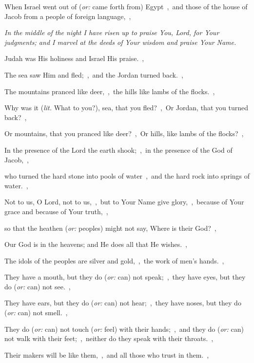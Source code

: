 \documentclass[12pt,twoside,a5paper]{article}
\newcommand{\qanona}[1]{{\liturgicalhint{Qanona.} \emph{#1}}}
\newcommand{\translationoption}[1]{\emph{or:} #1}
\newcommand{\translationliteral}[1]{\emph{lit.} #1}
\begin{document}
\begin{normalparskip}
  When Israel went out of (\translationoption{came forth from}) Egypt~\sep\ and those of the house of Jacob from a people of foreign language,~\sep

  \qanona{In the middle of the night I have risen up to praise You, Lord, for Your judgments; and I marvel at the deeds of Your wisdom and praise Your Name.}

  Judah was His holiness and Israel His praise.~\sep

  The sea saw Him and fled;~\sep\ and the Jordan turned back.~\sep

  The mountains pranced like deer,~\sep\ the hills like lambs of the flocks.~\sep

  Why was it (\translationliteral{What to you?}), sea, that you fled?~\sep\ Or Jordan, that you turned back?~\sep

  Or mountains, that you pranced like deer?~\sep\ Or hills, like lambs of the flocks?~\sep

  In the presence of the Lord the earth shook;~\sep\ in the presence of the God of Jacob,~\sep

  who turned the hard stone into pools of water~\sep\ and the hard rock into springs of water.~\sep

  Not to us, O Lord, not to us,~\sep\ but to Your Name give glory,~\sep\ because of Your grace and because of Your truth,~\sep

  so that the heathen (\translationoption{peoples}) might not say, Where is their God?~\sep

  Our God is in the heavens; and He does all that He wishes.~\sep

  The idols of the peoples are silver and gold,~\sep\ the work of men's hands.~\sep

  They have a mouth, but they do (\translationoption{can}) not speak;~\sep\ they have eyes, but they do (\translationoption{can}) not see.~\sep

  They have ears, but they do (\translationoption{can}) not hear;~\sep\ they have noses, but they do (\translationoption{can}) not smell.~\sep

  They do (\translationoption{can}) not touch (\translationoption{feel}) with their hands;~\sep\ and they do (\translationoption{can}) not walk with their feet;~\sep\ neither do they speak with their throats.~\sep

  Their makers will be like them,~\sep\ and all those who trust in them.~\sep


\end{normalparskip}
\end{document}
